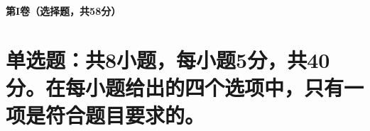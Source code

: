 \documentclass[10pt]{exam-zh}
\begin{document}
%




	\begin{center}
	\large	\textbf{第I卷（选择题，共58分）}
	\end{center}
	
	
	\section{单选题：共8小题，每小题5分，共40分。在每小题给出的四个选项中，只有一项是符合题目要求的。}
	
\end{document}
